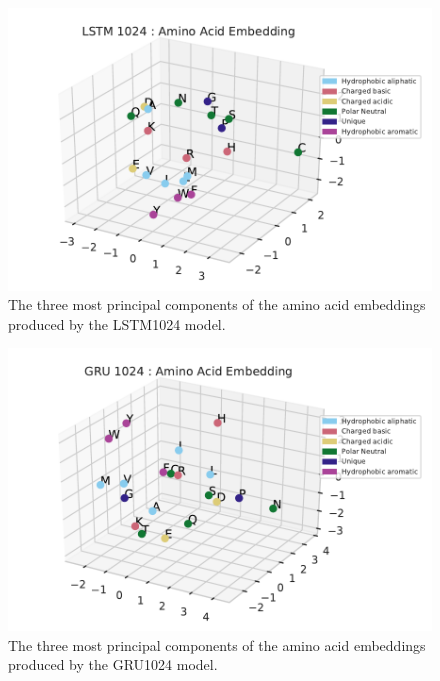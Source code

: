 \documentclass[a4paper,12pt]{article}
\begin{document}
\begin{figure}[H]
    \centering
    \includegraphics[width=\linewidth]{figures/fig2a_LSTM_1024_no_trunc.pdf}
    \caption{The three most principal components of the amino acid embeddings produced by the LSTM1024 model.}
    \label{fig:fig2a_LSTM}
\end{figure}

\begin{figure}[H]
    \centering
    \includegraphics[width=\linewidth]{figures/fig2a_GRU_1024_no_trunc.pdf}
    \caption{The three most principal components of the amino acid embeddings produced by the GRU1024 model.}
    \label{fig:fig2a_GRU}
\end{figure}
\end{document}
